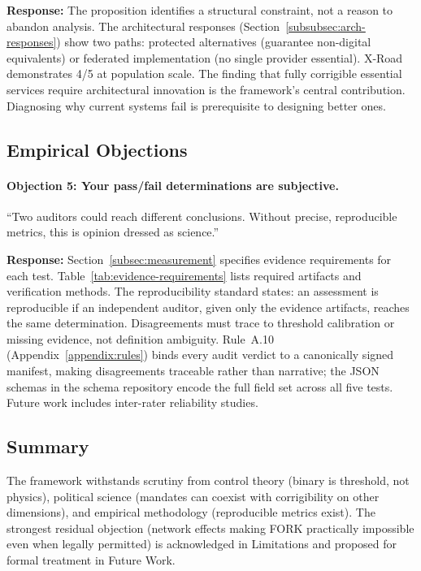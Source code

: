 \documentclass{article}
\begin{document}
\textbf{Response:} The proposition identifies a structural constraint, not a reason to abandon analysis. The architectural responses (Section~\ref{subsubsec:arch-responses}) show two paths: protected alternatives (guarantee non-digital equivalents) or federated implementation (no single provider essential). X-Road demonstrates 4/5 at population scale. The finding that fully corrigible essential services require architectural innovation is the framework's central contribution. Diagnosing why current systems fail is prerequisite to designing better ones.

\subsection{Empirical Objections}

\paragraph{Objection 5: Your pass/fail determinations are subjective.}
``Two auditors could reach different conclusions. Without precise, reproducible metrics, this is opinion dressed as science.''

\textbf{Response:} Section~\ref{subsec:measurement} specifies evidence requirements for each test. Table~\ref{tab:evidence-requirements} lists required artifacts and verification methods. The reproducibility standard states: an assessment is reproducible if an independent auditor, given only the evidence artifacts, reaches the same determination. Disagreements must trace to threshold calibration or missing evidence, not definition ambiguity. Rule~A.10 (Appendix~\ref{appendix:rules}) binds every audit verdict to a canonically signed manifest, making disagreements traceable rather than narrative; the JSON schemas in the schema repository encode the full field set across all five tests. Future work includes inter-rater reliability studies.

\subsection{Summary}

The framework withstands scrutiny from control theory (binary is threshold, not physics), political science (mandates can coexist with corrigibility on other dimensions), and empirical methodology (reproducible metrics exist). The strongest residual objection (network effects making FORK practically impossible even when legally permitted) is acknowledged in Limitations and proposed for formal treatment in Future Work.
\end{document}
